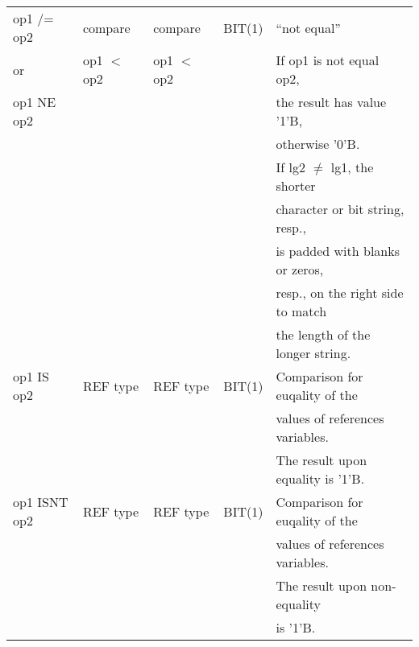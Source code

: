 \begin{table}
\begin{center}
\begin{tabular}{|l|l|l|l|l|}
op1 /= op2       & compare         & compare         & BIT(1)               & ``not equal''\\
or               & op1 $<$ op2     & op1 $<$ op2     &                      & If op1 is not equal op2,\\
op1 NE op2       &                 &                 &                      & the result has value '1'B,\\
                 &                 &                 &                      & otherwise '0'B.\\
                 &                 &                 &                      & If lg2 $\neq$ lg1, the shorter\\
                 &                 &                 &                      & character or bit string, resp.,\\
                 &                 &                 &                      & is padded with blanks or zeros,\\
                 &                 &                 &                      & resp., on the right side to match\\
                 &                 &                 &                      & the length of the longer string.\\ \hline

op1 IS op2       & REF type        & REF type        & BIT(1)               & Comparison for euqality of the\\
                 &                 &                 &                      & values of references variables.\\
                 &                 &                 &                      & The result upon equality is '1'B.\\ \hline

op1 ISNT op2     & REF type        & REF type        & BIT(1)               & Comparison for euqality of the\\
                 &                 &                 &                      & values of references variables.\\
                 &                 &                 &                      & The result upon non-equality\\
                 &                 &                 &                      & is '1'B.\\
\hline
\end{tabular}
\end{center}
\end{table}

